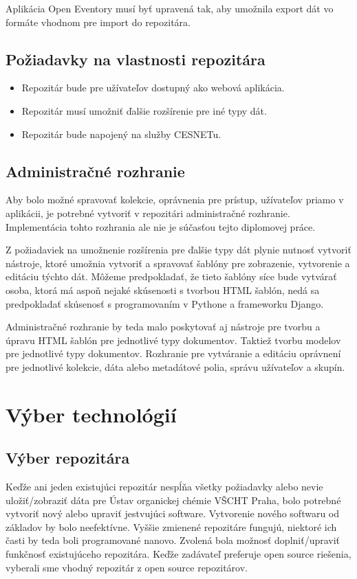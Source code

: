 \documentclass[thesis=M,slovak]{FITthesis}[2013/05/06]
\begin{document}
Aplikácia Open Eventory musí byť upravená tak, aby umožnila export dát vo formáte vhodnom pre import do repozitára.

\subsection{Požiadavky na vlastnosti repozitára}
\begin{itemize}
	\item Repozitár bude pre užívateľov dostupný ako webová aplikácia.
	\item Repozitár musí umožniť ďalšie rozšírenie pre iné typy dát.
	\item Repozitár bude napojený na služby CESNETu.
\end{itemize}

\subsection{Administračné rozhranie}
Aby bolo možné spravovať kolekcie, oprávnenia pre prístup, užívateľov priamo v aplikácii, je potrebné vytvoriť v repozitári administračné rozhranie. Implementácia tohto rozhrania ale nie je súčasťou tejto diplomovej práce.

Z požiadaviek na umožnenie rozšírenia pre ďalšie typy dát plynie nutnosť vytvoriť nástroje, ktoré umožnia vytvoriť a spravovať šablóny pre zobrazenie, vytvorenie a editáciu týchto dát. Môžeme predpokladať, že tieto šablóny síce bude vytvárať osoba, ktorá má aspoň nejaké skúsenosti s tvorbou HTML šablón, nedá sa predpokladať skúsenosť s programovaním v Pythone a frameworku Django. 

Administračné rozhranie by teda malo poskytovať aj nástroje pre tvorbu a úpravu HTML šablón pre jednotlivé typy dokumentov. Taktiež tvorbu modelov pre jednotlivé typy dokumentov.
Rozhranie pre vytváranie a editáciu oprávnení pre jednotlivé kolekcie, dáta alebo metadátové polia, správu užívateľov a skupín.


\section{Výber technológií}
\subsection{Výber repozitára}
Keďže ani jeden existujúci repozitár nespĺňa všetky požiadavky alebo nevie uložiť/zobraziť dáta pre Ústav organickej chémie VŠCHT Praha, bolo potrebné vytvoriť nový alebo upraviť jestvujúci software. Vytvorenie nového softwaru od základov by bolo neefektívne. Vyššie zmienené repozitáre fungujú, niektoré ich časti by teda boli programované nanovo. Zvolená bola možnosť doplniť/upraviť funkčnosť existujúceho repozitára. Keďže zadávateľ preferuje open source riešenia, vyberali sme vhodný repozitár z open source repozitárov.
\end{document}

